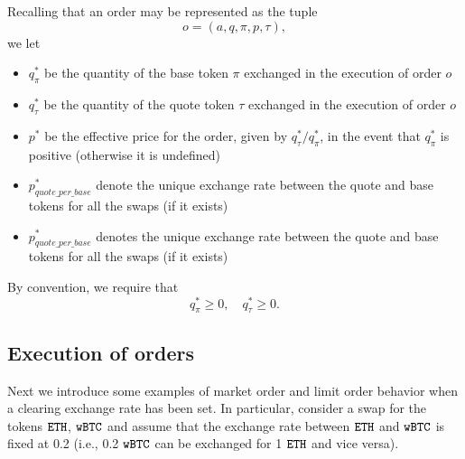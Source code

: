 \documentclass[11pt, reqno]{amsart}
\theoremstyle{definition}
\theoremstyle{remark}
\newcommand{\BTC}{\textnormal{\texttt{wBTC}}}
\newcommand{\ETH}{\textnormal{\texttt{ETH}}}
\begin{document}
Recalling that an order may be represented as the tuple
\[
	o = (a, q, \pi, p, \tau),
\]
we let
\begin{itemize}
	\item $q_\pi^*$ be the quantity of the base token $\pi$ exchanged in the
	      execution of order $o$
	\item $q_\tau^*$ be the quantity of the quote token $\tau$ exchanged in
          the execution of order $o$
      \item $p^*$ be the effective price for the order, given by
          $q_\tau^* / q_\pi^*$, in the event that $q_\pi^*$ is positive
          (otherwise it is undefined)
    \item $p_{quote\_per\_base}^*$ denote the unique exchange rate between the
          quote and base tokens for all the swaps (if it exists)
	\item $p_{quote\_per\_base}^*$ denotes the unique exchange rate between the
	      quote and base tokens for all the swaps (if it exists)
\end{itemize}
By convention, we require that
\[
    q_\pi^* \geq 0, \quad q_\tau^* \geq 0.
\]

\subsection{Execution of orders}
Next we introduce some examples of market order and limit order behavior when
a clearing exchange rate has been set.
In particular, consider a swap for the tokens $\ETH$, $\BTC$ and assume that
the exchange rate between $\ETH$ and $\BTC$ is fixed at 0.2 (i.e.,
0.2 $\BTC$ can be exchanged for 1 $\ETH$ and vice versa).
\end{document}
